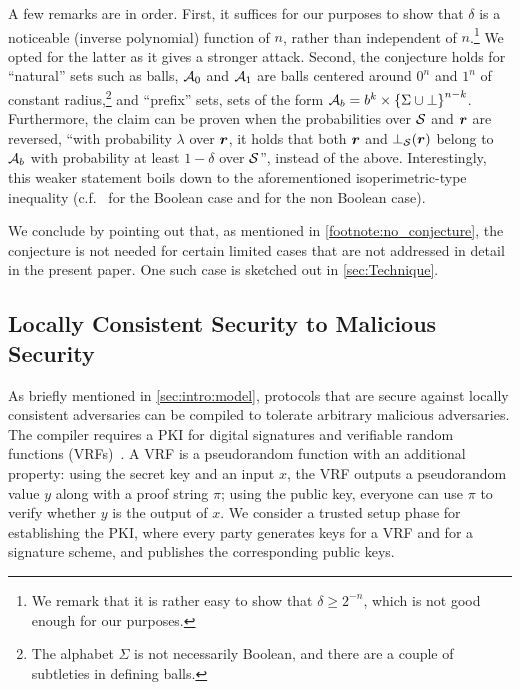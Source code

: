A few remarks are in order. First, it suffices for our purposes to show that $\delta$ is a noticeable (\ie inverse polynomial) function of $n$, rather than independent of $n$.\footnote{We remark that it is rather easy to show that $\delta\ge 2^{-n}$, which is not good enough for our purposes.} We opted for the latter as it gives a stronger attack. Second, the conjecture holds for ``natural'' sets such as balls, \ie $\mathcal{A}_0$ and $\mathcal{A}_1$ are balls centered around $0^n$ and $1^n$ of constant radius,\footnote{The alphabet $\Sigma$ is not necessarily Boolean, and there are a couple of subtleties in defining balls.} and ``prefix'' sets, \ie sets of the form $\mathcal{A}_b=b^k \times \left\{\Sigma \cup \bot\right\}^{n-k}$. Furthermore, the claim can be proven when the probabilities over $\mathcal{S}$ and ${ \boldsymbol{r}}$ are reversed, \ie ``with probability $\lambda$ over ${ \boldsymbol{r}}$, it holds that both ${ \boldsymbol{r}}$ and $\bot_{\mathcal{S}}({ \boldsymbol{r}})$ belong to $\mathcal{A}_b$ with probability at least $1-\delta$ over $\mathcal{S}$'', instead of the above. Interestingly, this weaker statement boils down to the aforementioned isoperimetric-type inequality (c.f.~\cite{MosselORSS2006} for the Boolean case and \cite{MosselOS2013} for the non Boolean case).

We conclude by pointing out that, as mentioned in \cref{footnote:no_conjecture}, the conjecture is not needed for certain limited cases that are not addressed in detail in the present paper. One such case is sketched out in \cref{sec:Technique}.

\subsection{Locally Consistent Security to Malicious Security}\label{sec:intro:LocalToFull}

As briefly mentioned in \cref{sec:intro:model}, protocols that are secure against locally consistent adversaries can be compiled to tolerate arbitrary malicious adversaries.
The compiler requires a PKI for digital signatures and verifiable random functions (VRFs)~\cite{MRV99}. A VRF is a pseudorandom function with an additional property: using the secret key and an input $x$, the VRF outputs a pseudorandom value $y$ along with a proof string $\pi$; using the public key, everyone can use $\pi$ to verify whether $y$ is the output of $x$. We consider a trusted setup phase for establishing the PKI, where every party generates keys for a VRF and for a signature scheme, and publishes the corresponding public keys.

